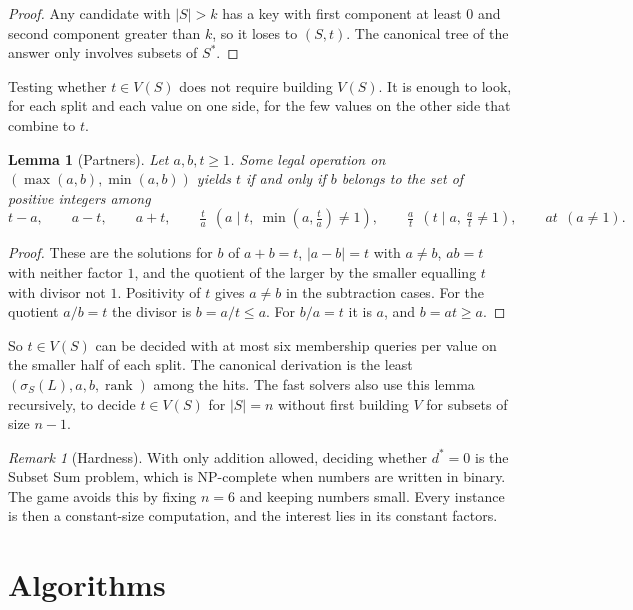 \documentclass[11pt,a4paper]{article}
\newtheorem{lemma}[theorem]{Lemma}
\theoremstyle{definition}
\theoremstyle{remark}
\newtheorem{remark}[theorem]{Remark}
\begin{document}
\begin{proof}
Any candidate with $|S| > k$ has a key with first component at least $0$ and second component greater than
$k$, so it loses to $(S, t)$. The canonical tree of the answer only involves subsets of $S^*$.
\end{proof}

Testing whether $t \in V(S)$ does not require building $V(S)$. It is enough to look, for each split and each
value on one side, for the few values on the other side that combine to $t$.

\begin{lemma}[Partners]\label{lem:partners}
Let $a, b, t \ge 1$. Some legal operation on $(\max(a, b), \min(a, b))$ yields $t$ if and only if $b$ belongs to
the set of positive integers among
\[
t - a, \qquad a - t, \qquad a + t, \qquad \tfrac{t}{a}\ \ (a \mid t,\ \min(a, \tfrac{t}{a}) \ne 1), \qquad
\tfrac{a}{t}\ \ (t \mid a,\ \tfrac{a}{t} \ne 1), \qquad a t\ \ (a \ne 1).
\]
\end{lemma}

\begin{proof}
These are the solutions for $b$ of $a + b = t$, $|a - b| = t$ with $a \ne b$, $a b = t$ with neither factor $1$,
and the quotient of the larger by the smaller equalling $t$ with divisor not $1$. Positivity of $t$ gives
$a \ne b$ in the subtraction cases. For the quotient $a / b = t$ the divisor is $b = a / t \le a$. For
$b / a = t$ it is $a$, and $b = a t \ge a$.
\end{proof}

So $t \in V(S)$ can be decided with at most six membership queries per value on the smaller half of each split.
The canonical derivation is the least $(\sigma_S(L), a, b, \operatorname{rank})$ among the hits. The fast
solvers also use this lemma recursively, to decide $t \in V(S)$ for $|S| = n$ without first building
$V$ for subsets of size $n - 1$.

\begin{remark}[Hardness]
With only addition allowed, deciding whether $d^* = 0$ is the Subset Sum problem, which is NP-complete when
numbers are written in binary. The game avoids this by fixing $n = 6$ and keeping numbers small.
Every instance is then a constant-size computation, and the interest lies in its constant factors.
\end{remark}

\section{Algorithms}\label{sec:algorithms}
\end{document}
